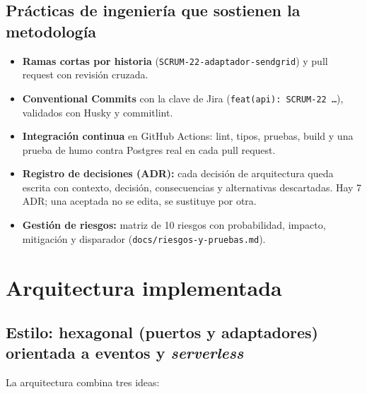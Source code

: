 \documentclass[11pt,a4paper]{article}
\begin{document}
\subsection{Prácticas de ingeniería que sostienen la metodología}
\begin{itemize}
  \item \textbf{Ramas cortas por historia} (\texttt{SCRUM-22-adaptador-sendgrid}) y pull request con revisión cruzada.
  \item \textbf{Conventional Commits} con la clave de Jira (\texttt{feat(api): SCRUM-22 \dots}), validados con Husky
        y commitlint.
  \item \textbf{Integración continua} en GitHub Actions: lint, tipos, pruebas, build y una prueba de humo contra
        Postgres real en cada pull request.
  \item \textbf{Registro de decisiones (ADR):} cada decisión de arquitectura queda escrita con contexto, decisión,
        consecuencias y alternativas descartadas. Hay 7 ADR; una aceptada no se edita, se sustituye por otra.
  \item \textbf{Gestión de riesgos:} matriz de 10 riesgos con probabilidad, impacto, mitigación y disparador
        (\texttt{docs/riesgos-y-pruebas.md}).
\end{itemize}

\section{Arquitectura implementada}

\subsection{Estilo: hexagonal (puertos y adaptadores) orientada a eventos y \emph{serverless}}

La arquitectura combina tres ideas:
\end{document}
